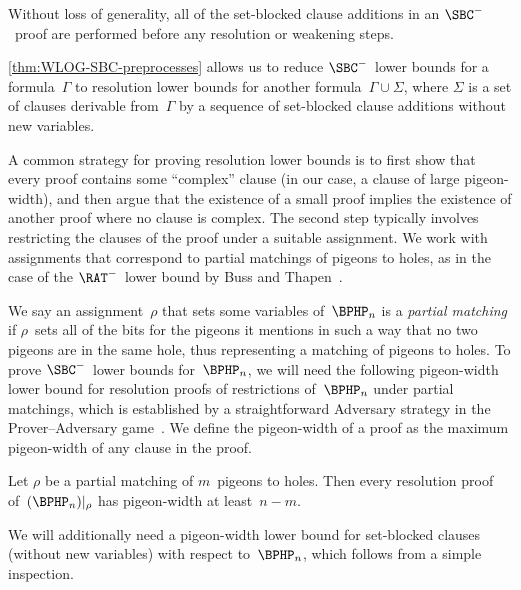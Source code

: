 \documentclass[10pt,a4paper]{article}
\begin{document}
\begin{lemma}\label{thm:WLOG-SBC-preprocesses}
  Without loss of generality,
  all of the set-blocked clause additions in an $\SBC^-$~proof
  are performed before any resolution or weakening steps.
\end{lemma}

\cref{thm:WLOG-SBC-preprocesses} allows us to reduce
$\SBC^-$~lower bounds for a formula~$\Gamma$
to resolution lower bounds for another formula~$\Gamma \cup \Sigma$,
where $\Sigma$ is a set of clauses derivable from~$\Gamma$
by a sequence of set-blocked clause additions without new variables.

A common strategy for proving resolution lower bounds is to
first show that every proof contains some ``complex'' clause
(in our case, a clause of large pigeon-width),
and then argue that the existence of a small proof
implies the existence of another proof where no clause is complex.
The second step typically involves restricting
the clauses of the proof under a suitable assignment.
We work with assignments that correspond to
partial matchings of pigeons to holes,
as in the case of the $\RAT^-$~lower bound
by Buss and Thapen~\cite[Section~5]{BT21}.

We say an assignment~$\rho$ that sets some variables of~$\BPHP_n$
is a \emph{partial matching} if $\rho$~sets
all of the bits for the pigeons it mentions
in such a way that no two pigeons are in the same hole,
thus representing a matching of pigeons to holes.
To prove $\SBC^-$~lower bounds for~$\BPHP_n$,
we will need the following pigeon-width lower bound
for resolution proofs of restrictions of~$\BPHP_n$ under partial matchings,
which is established by a straightforward Adversary strategy
in the Prover--Adversary game~\cite{Pud00}.
We define the pigeon-width of a proof
as the maximum pigeon-width of any clause in the proof.

\begin{lemma}[{\cite[Lemma~5.2]{BT21}}]\label{thm:resolution-width-lower-bound-for-BPHP}
  Let $\rho$ be a partial matching of $m$~pigeons to holes.
  Then every resolution proof of~$(\BPHP_n)|_\rho$
  has pigeon-width at least~$n - m$.
\end{lemma}

We will additionally need a pigeon-width lower bound for
set-blocked clauses (without new variables)
with respect to~$\BPHP_n$, which follows from a simple inspection.
\end{document}
